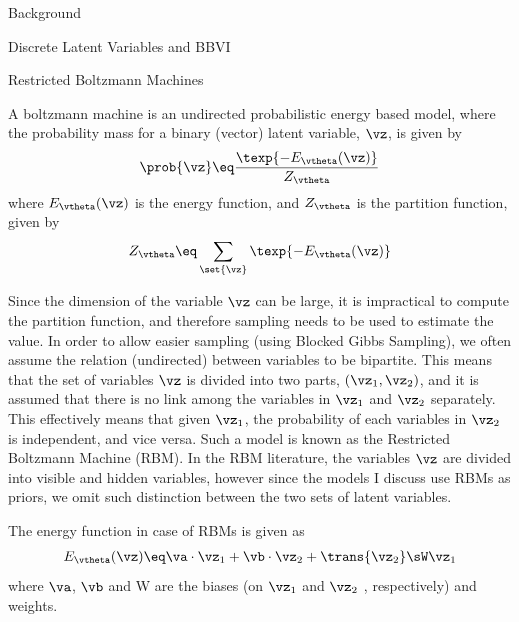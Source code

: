 \documentclass{article}
\begin{document}
\begin{psection}{Background}
\begin{psubsection}{Discrete Latent Variables and BBVI}
	\end{psubsection}

	\begin{psubsection}{Restricted Boltzmann Machines}

		A boltzmann machine is an undirected probabilistic energy based model, where the probability mass for a binary (vector) latent variable, $\vz$, is given by
		\begin{align}
			\prob{\vz} \eq \frac{\texp{- E_\vtheta(\vz)}}{Z_\vtheta}
			\label{eq:bm-prob}
		\end{align}
		where $E_\vtheta(\vz)$ is the energy function, and $Z_\vtheta$ is the partition function, given by
		\begin{align*}
			Z_\vtheta \eq \sum_{\set{\vz}} \texp{- E_\vtheta(\vz)}
		\end{align*}

		Since the dimension of the variable $\vz$ can be large, it is impractical to compute the partition function, and therefore sampling needs to be used to estimate the value. In order to allow easier sampling (using Blocked Gibbs Sampling), we often assume the relation (undirected) between variables to be bipartite. This means that the set of variables $\vz$ is divided into two parts, $(\vz_1, \vz_2)$, and it is assumed that there is no link among the variables in $\vz_1$ and $\vz_2$ separately. This effectively means that given $\vz_1$, the probability of each variables in $\vz_2$ is independent, and vice versa. Such a model is known as the Restricted Boltzmann Machine (RBM). In the RBM literature, the variables $\vz$ are divided into visible and hidden variables, however since the models I discuss use RBMs as priors, we omit such distinction between the two sets of latent variables.

		The energy function in case of RBMs is given as
		\begin{align}
			E_\vtheta(\vz) \eq \va \cdot \vz_1 + \vb \cdot \vz_2 + \trans{\vz_2} \sW \vz_1
			\label{eq:energy-function}
		\end{align}
		where $\va$, $\vb$ and W are the biases (on $\vz_1$ and $\vz_2$ , respectively) and weights.

	\end{psubsection}

\end{psection}
\end{document}
